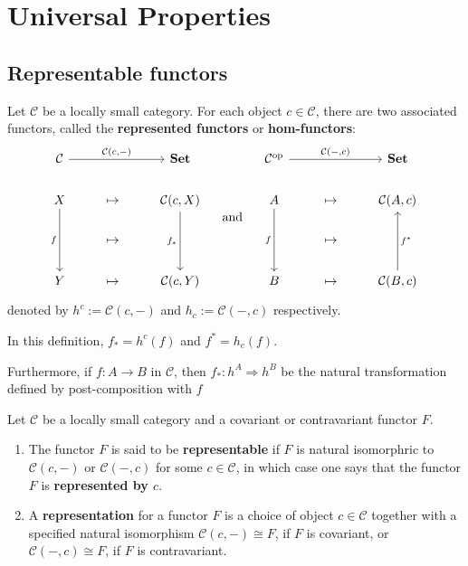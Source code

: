 \documentclass[12pt, oneside]{book}
\begin{document}
\chapter{Universal Properties} %
\section{Representable functors}
\begin{definition}
    Let $\mathcal{C}$ be a locally small category. For each object $c \in \mathcal{C}$, there are two associated functors, called the \textbf{represented functors} or \textbf{hom-functors}:
    \begin{equation*}
        \begin{tikzcd}
            \mathcal{C} \arrow[rr, "{\mathcal{C}(c,-)}"] & & \mathbf{Set} \\
            X \arrow[dd, "f"']    & \mapsto & \mathcal{C}(c, X)\arrow[dd, "f_*"'] \\
            & \mapsto & \\
            Y          &  \mapsto & \mathcal{C}(c, Y)
        \end{tikzcd}
        \quad \text{ and  } \quad
        \begin{tikzcd}
            \mathcal{C}^{\mathrm{op}} \arrow[rr, "{\mathcal{C}(-,c)}"] & & \mathbf{Set} \\
            A \arrow[dd, "f"']    & \mapsto & \mathcal{C}(A, c) \\
            & \mapsto & \\
            B          &  \mapsto & \mathcal{C}(B, c)\arrow[uu, "f^*"']
        \end{tikzcd}
    \end{equation*}
    denoted by $h^c:=\mathcal{C}(c,-)$ and $h_c:=\mathcal{C}(-,c)$ respectively. \begin{remark}
        In this definition, $f_*=h^c(f)$ and $f^*=h_c(f)$.

        Furthermore, if $f:A\rightarrow B$ in $\mathcal{C}$, then $f_*:h^A\Rightarrow h^B$ be the natural transformation defined by post-composition with $f$
    \end{remark}
\end{definition}
\begin{definition}
    Let $\mathcal{C}$ be a locally small category and a covariant or contravariant functor $F$.
    \begin{enumerate}
        \item
              The functor $F$ is said to be \textbf{representable} if $F$ is natural isomorphric to  $\mathcal{C}\left( c,- \right)$ or $\mathcal{C}\left( -,c \right)$ for some $c\in \mathcal{C}$, in which case one says that the functor $F$ is \textbf{represented by $c$}.

        \item
              A \textbf{representation} for a functor $F$ is a choice of object $c \in \mathcal{C}$ together with a specified natural isomorphism $\mathcal{C}(c,-) \cong F$, if $F$ is covariant, or $\mathcal{C}(-, c) \cong F$, if $F$ is contravariant.
    \end{enumerate}
\end{definition}
\end{document}

